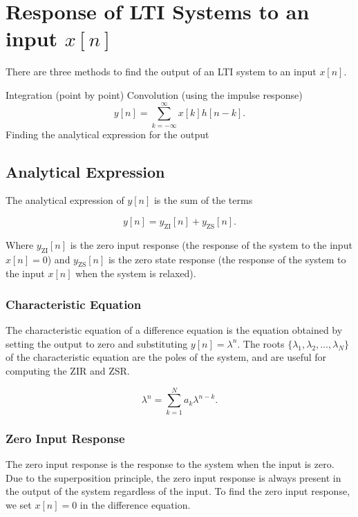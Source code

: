 \documentclass{report}
\begin{document}
\section{Response of LTI Systems to an input $x[n]$}

There are three methods to find the output of an LTI system to an input $x[n]$.

\begin{enumerate}
	\ii Integration (point by point)
	\ii Convolution (using the impulse response)
	\[
		y[n] = \sum_{k=-\infty}^{\infty} x[k]h[n-k]
		.\]
	\ii Finding the analytical expression for the output
\end{enumerate}

\subsection{Analytical Expression}

The analytical expression of $y[n]$ is the sum of the terms

\[
	y[n] = y_\text{ZI}[n] + y_\text{ZS}[n]
	.\]

Where $y_\text{ZI}[n]$ is the zero input response (the response of the system to the input $x[n]=0$) and $y_\text{ZS}[n]$ is the zero state response (the response of the system to the input $x[n]$ when the system is relaxed).

\subsubsection{Characteristic Equation}

The characteristic equation of a difference equation is the equation obtained by setting the output to zero and substituting $y[n] = \lambda^n$.
The roots $\{\lambda_1, \lambda_2, \ldots, \lambda_N\}$ of the characteristic equation are the poles of the system, and are useful for computing the ZIR and ZSR.

\[
	\lambda^n = \sum_{k=1}^{N} a_k \lambda^{n-k}
	.\]

\subsubsection{Zero Input Response}

The zero input response is the response to the system when the input is zero.
Due to the superposition principle, the zero input response is always present in the output of the system regardless of the input.
To find the zero input response, we set $x[n]=0$ in the difference equation.
\end{document}

